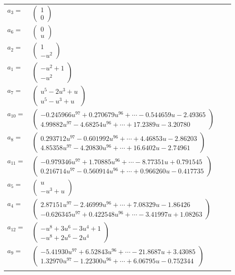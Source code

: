 \documentclass[1p]{elsarticle_modified}
\theoremstyle{definition}
\begin{document}
\begin{tabular}{m{7pt} m{180pt} m{7pt} m{180pt} }
\flushright $a_{3}=$&$\begin{pmatrix}1\\0\end{pmatrix}$ \\
\flushright $a_{6}=$&$\begin{pmatrix}0\\u\end{pmatrix}$ \\
\flushright $a_{2}=$&$\begin{pmatrix}1\\- u^2\end{pmatrix}$ \\
\flushright $a_{1}=$&$\begin{pmatrix}- u^2+1\\- u^2\end{pmatrix}$ \\
\flushright $a_{7}=$&$\begin{pmatrix}u^5-2 u^3+u\\u^5- u^3+u\end{pmatrix}$ \\
\flushright $a_{10}=$&$\begin{pmatrix}-0.245966 u^{97}+0.270679 u^{96}+\cdots-0.544659 u-2.49365\\4.99882 u^{97}-4.68254 u^{96}+\cdots+17.2389 u-3.20780\end{pmatrix}$ \\
\flushright $a_{8}=$&$\begin{pmatrix}0.293712 u^{97}-0.601992 u^{96}+\cdots+4.46853 u-2.86203\\4.85358 u^{97}-4.20830 u^{96}+\cdots+16.6402 u-2.74961\end{pmatrix}$ \\
\flushright $a_{11}=$&$\begin{pmatrix}-0.979346 u^{97}+1.70885 u^{96}+\cdots-8.77351 u+0.791545\\0.216714 u^{97}-0.560914 u^{96}+\cdots+0.966260 u-0.417735\end{pmatrix}$ \\
\flushright $a_{5}=$&$\begin{pmatrix}u\\- u^3+u\end{pmatrix}$ \\
\flushright $a_{4}=$&$\begin{pmatrix}2.87151 u^{97}-2.46999 u^{96}+\cdots+7.08329 u-1.86426\\-0.626345 u^{97}+0.422548 u^{96}+\cdots-3.41997 u+1.08263\end{pmatrix}$ \\
\flushright $a_{12}=$&$\begin{pmatrix}- u^8+3 u^6-3 u^4+1\\- u^8+2 u^6-2 u^4\end{pmatrix}$ \\
\flushright $a_{9}=$&$\begin{pmatrix}-5.41930 u^{97}+6.52843 u^{96}+\cdots-21.8687 u+3.43085\\1.32970 u^{97}-1.22300 u^{96}+\cdots+6.06795 u-0.752344\end{pmatrix}$\\&\end{tabular}
\end{document}
